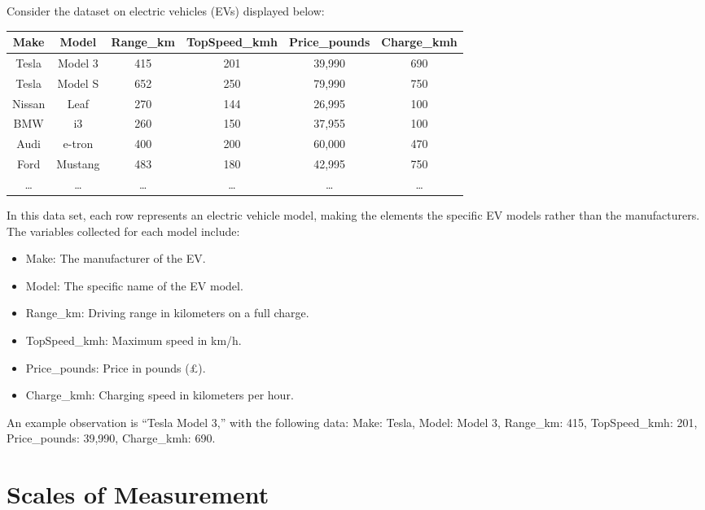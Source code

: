 \documentclass[
  11pt,
  letterpaper,
  DIV=11,
  numbers=noendperiod,
  oneside,
  open=any]{scrreprt}
\providecommand{\tightlist}{%
  \setlength{\itemsep}{0pt}\setlength{\parskip}{0pt}}\usepackage{longtable,booktabs,array}
\begin{document}
\begin{bsexample}[Example]

Consider the dataset on electric vehicles (EVs) displayed below:

\begin{center}
\begin{tabular}{cccccc}
\toprule
Make & Model & Range\_km & TopSpeed\_kmh & Price\_pounds & Charge\_kmh \\
\midrule
Tesla & Model 3 & 415 & 201 & 39,990 & 690 \\
Tesla & Model S & 652 & 250 & 79,990 & 750 \\
Nissan & Leaf & 270 & 144 & 26,995 & 100 \\
BMW & i3 & 260 & 150 & 37,955 & 100 \\
Audi & e-tron & 400 & 200 & 60,000 & 470 \\
Ford & Mustang & 483 & 180 & 42,995 & 750 \\
\ldots{} & \ldots{} & \ldots{} & \ldots{} & \ldots{} & \ldots{} \\
\bottomrule
\end{tabular}
\end{center}

In this data set, each row represents an electric vehicle model, making
the elements the specific EV models rather than the manufacturers. The
variables collected for each model include:

\begin{itemize}
\tightlist
\item
  Make: The manufacturer of the EV.
\item
  Model: The specific name of the EV model.
\item
  Range\_km: Driving range in kilometers on a full charge.
\item
  TopSpeed\_kmh: Maximum speed in km/h.
\item
  Price\_pounds: Price in pounds (£).
\item
  Charge\_kmh: Charging speed in kilometers per hour.
\end{itemize}

An example observation is ``Tesla Model 3,'' with the following data:
Make: Tesla, Model: Model 3, Range\_km: 415, TopSpeed\_kmh: 201,
Price\_pounds: 39,990, Charge\_kmh: 690.

\end{bsexample}

\section{Scales of Measurement}\label{scales-of-measurement}
\end{document}
